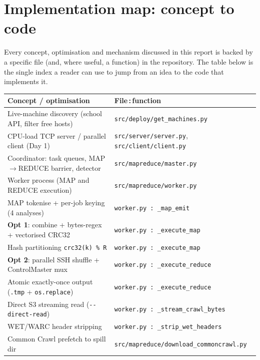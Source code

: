 \documentclass[11pt,a4paper]{article}
\newcommand{\code}[1]{\texttt{\small #1}}
\begin{document}
\section{Implementation map: concept to code}\label{sec:implmap}

Every concept, optimisation and mechanism discussed in this report is backed by
a specific file (and, where useful, a function) in the repository. The table
below is the single index a reader can use to jump from an idea to the code that
implements it.

\begin{table}[H]
\centering
\small
\renewcommand{\arraystretch}{1.25}
\begin{tabularx}{\textwidth}{@{}X l@{}}
\toprule
\textbf{Concept / optimisation} & \textbf{File\,:\,function}\\
\midrule
Live-machine discovery (school API, filter free hosts) & \code{src/deploy/get\_machines.py}\\
CPU-load TCP server / parallel client (Day 1) & \code{src/server/server.py}, \code{src/client/client.py}\\
Coordinator: task queues, MAP$\to$REDUCE barrier, detector & \code{src/mapreduce/master.py}\\
Worker process (MAP and REDUCE execution) & \code{src/mapreduce/worker.py}\\
MAP tokenise + per-job keying (4 analyses) & \code{worker.py\,:\,\_map\_emit}\\
\textbf{Opt 1}: combine + bytes-regex + vectorised CRC32 & \code{worker.py\,:\,\_execute\_map}\\
Hash partitioning \code{crc32(k)\,\%\,R} & \code{worker.py\,:\,\_execute\_map}\\
\textbf{Opt 2}: parallel SSH shuffle + ControlMaster mux & \code{worker.py\,:\,\_execute\_reduce}\\
Atomic exactly-once output (\code{.tmp} + \code{os.replace}) & \code{worker.py\,:\,\_execute\_reduce}\\
Direct S3 streaming read (\code{-{}-direct-read}) & \code{worker.py\,:\,\_stream\_crawl\_bytes}\\
WET/WARC header stripping & \code{worker.py\,:\,\_strip\_wet\_headers}\\
Common Crawl prefetch to spill dir & \code{src/mapreduce/download\_commoncrawl.py}\\

\end{tabularx}
\end{table}
\end{document}
